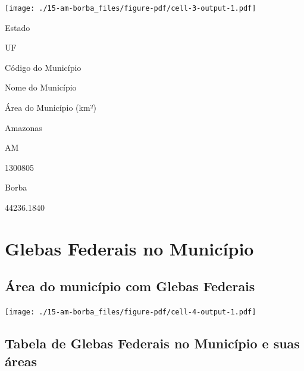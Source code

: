 \documentclass[
  letterpaper,
]{report}
\begin{document}
\texttt{[image: ./15-am-borba\_files/figure-pdf/cell-3-output-1.pdf]}

\n  

\n    

\n      

Estado

\n      

UF

\n      

Código do Município

\n      

Nome do Município

\n      

Área do Município (km²)

\n    

\n  

\n  

\n    

\n      

Amazonas

\n      

AM

\n      

1300805

\n      

Borba

\n      

44236.1840

\n    

\n  

\n

\hypertarget{glebas-federais-no-municuxedpio-1}{%
\section{Glebas Federais no
Município}\label{glebas-federais-no-municuxedpio-1}}

\hypertarget{uxe1rea-do-municuxedpio-com-glebas-federais-1}{%
\subsection{Área do município com Glebas
Federais}\label{uxe1rea-do-municuxedpio-com-glebas-federais-1}}

\texttt{[image: ./15-am-borba\_files/figure-pdf/cell-4-output-1.pdf]}

\hypertarget{tabela-de-glebas-federais-no-municuxedpio-e-suas-uxe1reas-1}{%
\subsection{Tabela de Glebas Federais no Município e suas
áreas}\label{tabela-de-glebas-federais-no-municuxedpio-e-suas-uxe1reas-1}}
\end{document}
